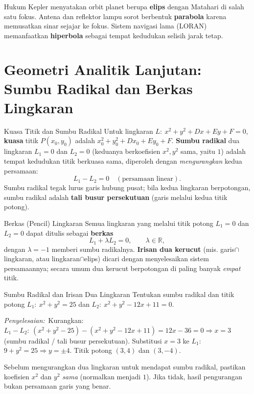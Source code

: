 \documentclass[11pt,a4paper]{report}
\theoremstyle{gaya}
\newcommand{\jawab}{\par\smallskip\noindent\textit{\textcolor{oranye}{Penyelesaian:}}\ }
\begin{document}
\begin{dunianyata}
Hukum Kepler menyatakan orbit planet berupa \textbf{elips} dengan Matahari di salah satu fokus. Antena dan reflektor lampu sorot berbentuk \textbf{parabola} karena memusatkan sinar sejajar ke fokus. Sistem navigasi lama (LORAN) memanfaatkan \textbf{hiperbola} sebagai tempat kedudukan selisih jarak tetap.
\end{dunianyata}

\section{Geometri Analitik Lanjutan: Sumbu Radikal dan Berkas Lingkaran}
\begin{konsep}{Kuasa Titik dan Sumbu Radikal}
Untuk lingkaran $L:\ x^2+y^2+Dx+Ey+F=0$, \textbf{kuasa} titik $P(x_0,y_0)$ adalah $x_0^2+y_0^2+Dx_0+Ey_0+F$. \textbf{Sumbu radikal} dua lingkaran $L_1=0$ dan $L_2=0$ (keduanya berkoefisien $x^2,y^2$ sama, yaitu $1$) adalah tempat kedudukan titik berkuasa sama, diperoleh dengan \emph{mengurangkan} kedua persamaan:
\[
L_1-L_2=0 \quad(\text{persamaan linear}).
\]
Sumbu radikal tegak lurus garis hubung pusat; bila kedua lingkaran berpotongan, sumbu radikal adalah \textbf{tali busur persekutuan} (garis melalui kedua titik potong).
\end{konsep}

\begin{konsep}{Berkas (Pencil) Lingkaran}
Semua lingkaran yang melalui titik potong $L_1=0$ dan $L_2=0$ dapat ditulis sebagai \textbf{berkas}
\[
L_1+\lambda L_2=0,\qquad \lambda\in\mathbb{R},
\]
dengan $\lambda=-1$ memberi sumbu radikalnya. \textbf{Irisan dua kerucut} (mis. garis$\cap$lingkaran, atau lingkaran$\cap$elips) dicari dengan menyelesaikan sistem persamaannya; secara umum dua kerucut berpotongan di paling banyak \emph{empat} titik.
\end{konsep}

\begin{contoh}{Sumbu Radikal dan Irisan Dua Lingkaran}
Tentukan sumbu radikal dan titik potong $L_1:\ x^2+y^2=25$ dan $L_2:\ x^2+y^2-12x+11=0$.

\jawab Kurangkan: $L_1-L_2:\ (x^2+y^2-25)-(x^2+y^2-12x+11)=12x-36=0\Rightarrow x=3$ (sumbu radikal / tali busur persekutuan). Substitusi $x=3$ ke $L_1$: $9+y^2=25\Rightarrow y=\pm4$. Titik potong $(3,4)$ dan $(3,-4)$.
\end{contoh}

\begin{kesalahan}
Sebelum mengurangkan dua lingkaran untuk mendapat sumbu radikal, pastikan koefisien $x^2$ dan $y^2$ \emph{sama} (normalkan menjadi $1$). Jika tidak, hasil pengurangan bukan persamaan garis yang benar.
\end{kesalahan}
\end{document}
